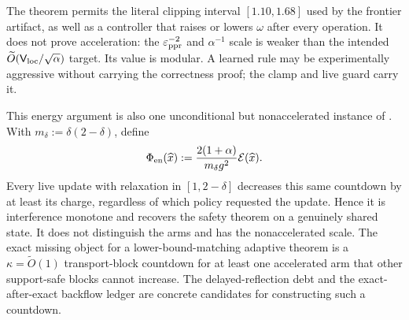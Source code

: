 The theorem permits the literal clipping interval $[1.10,1.68]$ used by the
frontier artifact, as well as a controller that raises or lowers $\omega$
after every operation.  It does not prove acceleration: the
$\varepsilon_{\mathrm{ppr}}^{-2}$ and $\alpha^{-1}$ scale is weaker than the intended
$\widetilde O(\mathsf V_{\rm loc}/\sqrt\alpha)$ target.  Its value is modular.  A learned rule
may be experimentally aggressive without carrying the correctness proof; the
clamp and live guard carry it.

This energy argument is also one unconditional but nonaccelerated instance
of .  With
$m_\delta:=\delta(2-\delta)$, define
\begin{equation}
 \Phi_{\rm en}(\widehat x)
 :=\frac{2(1+\alpha)}{m_\delta g^2}\mathcal E(\widehat x).
 \label{eq:energy-countdown}
\end{equation}
Every live update with relaxation in $[1,2-\delta]$ decreases this same
countdown by at least its charge, regardless of which policy requested the
update.  Hence it is interference monotone and recovers the safety theorem on
a genuinely shared state.  It does not distinguish the arms and has the
nonaccelerated scale.  The exact missing object for a lower-bound-matching
adaptive theorem is a $\kappa=\widetilde O(1)$ transport-block countdown for
at least one accelerated arm that other support-safe blocks cannot increase.
The delayed-reflection debt and the exact-after-exact backflow ledger are
concrete candidates for constructing such a countdown.
